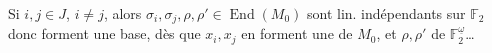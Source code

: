Si $i,j\in J$, $i\ne j$, alors $\sigma_i,\sigma_j,\rho,\rho'\in\operatorname{End}(M_0)$ sont lin. indépendants sur $\mathbb{F}_2$ donc forment une base,  dès que $x_i,x_j$ en forment une de $M_0$, et $\rho,\rho'$ de $\mathbb{F}_2^{\underline{\omega}}$\ldots

